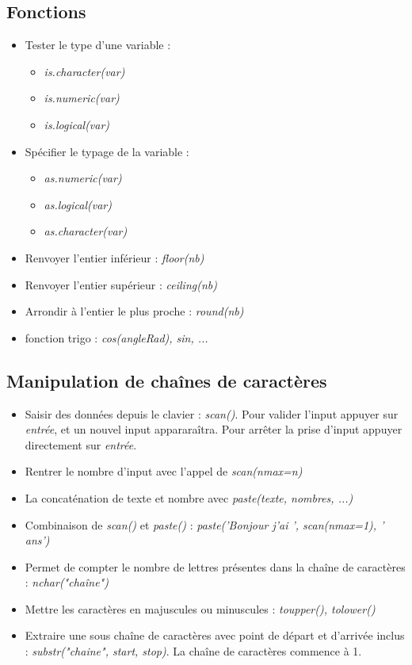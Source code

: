 \documentclass[12pt,a4paper]{article}
\begin{document}
\subsection{Fonctions}
\begin{itemize}
\item Tester le type d'une variable :
\begin{itemize}
\item \textit{is.character(var)}
\item \textit{is.numeric(var)}
\item \textit{is.logical(var)}
\end{itemize}
\item Spécifier le typage de la variable :
\begin{itemize}
\item \textit{as.numeric(var)}
\item \textit{as.logical(var)}
\item \textit{as.character(var)}
\end{itemize}
\item Renvoyer l'entier inférieur : \textit{floor(nb)}
\item Renvoyer l'entier supérieur : \textit{ceiling(nb)}
\item Arrondir à l'entier le plus proche : \textit{round(nb)}
\item fonction trigo : \textit{cos(angleRad), sin, ...}
\end{itemize}

\subsection{Manipulation de chaînes de caractères}
\begin{itemize}
\item Saisir des données depuis le clavier : \textit{scan()}. Pour valider l'input appuyer sur \textit{entrée}, et un nouvel input appararaîtra. Pour arrêter la prise d'input appuyer directement sur \textit{entrée}.
\item Rentrer le nombre d'input avec l'appel de \textit{scan(nmax=n)}
\item La concaténation de texte et nombre avec \textit{paste(texte, nombres, ...)}
\item Combinaison de \textit{scan()} et \textit{paste()} : \textit{paste('Bonjour j'ai ', scan(nmax=1), ' ans')}
\item Permet de compter le nombre de lettres présentes dans la chaîne de caractères : \textit{nchar("chaîne")}
\item Mettre les caractères en majuscules ou minuscules : \textit{toupper(), tolower()}
\item Extraire une sous chaîne de caractères avec point de départ et d'arrivée inclus : \textit{substr("chaine", start, stop)}. La chaîne de caractères commence à 1.
\end{itemize}
\end{document}
